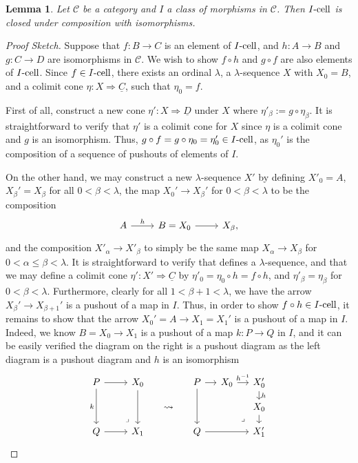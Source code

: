 \documentclass{amsart}
\theoremstyle{plain}
\newtheorem{lemma}[theorem]{Lemma}
\theoremstyle{definition}
\newcommand{\0}{\mathbf{0}}
\newcommand{\cC}{\mathcal C}
\renewcommand{\(}{\left(}
\renewcommand{\)}{\right)}
\newcommand{\cell}{\text-\mathrm{cell}}
\begin{document}
\begin{lemma}\label{I-cell_closed_under_composition_with_isomorphisms}
  Let $\cC$ be a category and $I$ a class of morphisms in $\cC$. Then $I\cell$ is closed under composition with isomorphisms.
\end{lemma}
\begin{proof}[Proof Sketch]
  Suppose that $f:B\to C$ is an element of $I\cell$, and $h:A\to B$ and $g:C\to D$ are isomorphisms in $\cC$. We wish to show $f\circ h$ and $g\circ f$ are also elements of $I\cell$. Since $f\in I\cell$, there exists an ordinal $\lambda$, a $\lambda$-sequence $X$ with $X_0=B$, and a colimit cone $\eta:X\Rightarrow\underline C$, such that $\eta_0=f$. 
  
  First of all, construct a new cone $\eta':X\Rightarrow\underline D$ under $X$ where $\eta'_\beta:=g\circ\eta_\beta$. It is straightforward to verify that $\eta'$ is a colimit cone for $X$ since $\eta$ is a colimit cone and $g$ is an isomorphism. Thus, $g\circ f=g\circ\eta_0=\eta_0'\in I\cell$, as $\eta_0'$ is the composition of a sequence of pushouts of elements of $I$.

  On the other hand, we may construct a new $\lambda$-sequence $X'$ by defining $X'_0=A$, $X_\beta'=X_\beta$ for all $0<\beta<\lambda$, the map $X_0'\to X_\beta'$ for $0<\beta<\lambda$ to be the composition
  \[\begin{tikzcd}
    A & {B=X_0} & {X_\beta},
    \arrow["h", from=1-1, to=1-2]
    \arrow[from=1-2, to=1-3]
  \end{tikzcd}\]
  and the composition $X'_\alpha\to X'_\beta$ to simply be the same map $X_\alpha\to X_\beta$ for $0<\alpha\leq \beta<\lambda$. It is straightforward to verify that defines a $\lambda$-sequence, and that we may define a colimit cone $\eta':X'\Rightarrow\underline C$ by $\eta'_0=\eta_0\circ h=f\circ h$, and $\eta'_\beta=\eta_\beta$ for $0<\beta<\lambda$. Furthermore, clearly for all $1<\beta+1<\lambda$, we have the arrow $X_\beta'\to X_{\beta+1}'$ is a pushout of a map in $I$. Thus, in order to show $f\circ h\in I\cell$, it remains to show that the arrow $X_0'=A\to X_1=X_1'$ is a pushout of a map in $I$. Indeed, we know $B=X_0\to X_1$ is a pushout of a map $k:P\to Q$ in $I$, and it can be easily verified the diagram on the right is a pushout diagram as the left diagram is a pushout diagram and $h$ is an isomorphism
  \[\begin{tikzcd}[row sep=small,column sep=small]
    P && {X_0} && P & {X_0} & {X_0'} \\
    &&& \leadsto &&& {X_0} \\
    Q && {X_1} && Q && {X_1'}
    \arrow[from=1-3, to=3-3]
    \arrow[from=3-1, to=3-3]
    \arrow[from=1-1, to=1-3]
    \arrow["k"', from=1-1, to=3-1]
    \arrow["\ulcorner"{anchor=center, pos=0.125, rotate=180}, draw=none, from=3-3, to=1-1]
    \arrow[from=1-5, to=1-6]
    \arrow["h", from=1-7, to=2-7]
    \arrow[from=2-7, to=3-7]
    \arrow[from=1-5, to=3-5]
    \arrow[from=3-5, to=3-7]
    \arrow["{h^{-1}}", from=1-6, to=1-7]
    \arrow["\ulcorner"{anchor=center, pos=0.125, rotate=180}, draw=none, from=3-7, to=1-5]
  \end{tikzcd}\qedhere\]
\end{proof}
\end{document}
